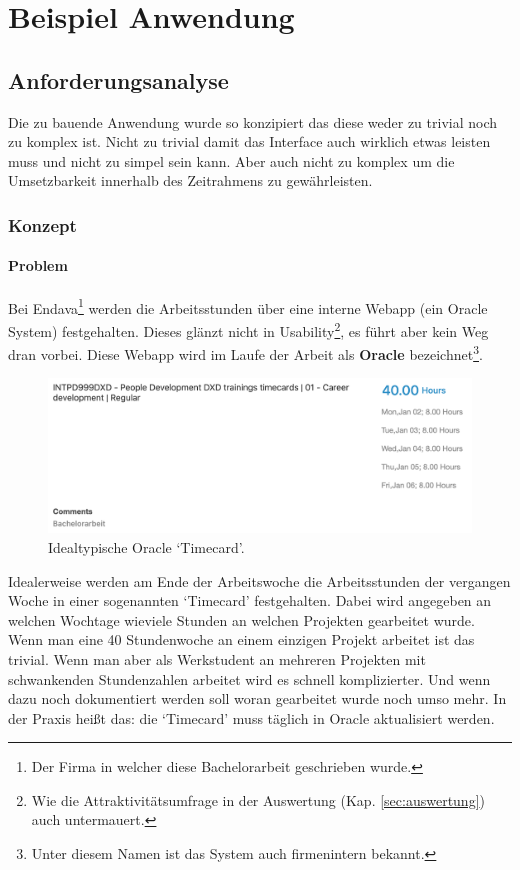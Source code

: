 \documentclass[oneside,bibliography=totocnumbered,BCOR=5mm]{scrbook}
\begin{document}
\chapter{Beispiel Anwendung}
\label{sec:beispiel-anwendung}

\section{Anforderungsanalyse}

Die zu bauende Anwendung wurde so konzipiert das diese weder zu trivial noch
zu komplex ist. Nicht zu trivial damit das Interface auch wirklich etwas
leisten muss und nicht zu simpel sein kann. Aber auch nicht zu komplex um die
Umsetzbarkeit innerhalb des Zeitrahmens zu gewährleisten.

\subsection{Konzept}
\subsubsection{Problem}

Bei Endava\footnote{Der Firma in welcher diese Bachelorarbeit geschrieben
wurde.} werden die Arbeitsstunden über eine interne Webapp (ein Oracle
System) festgehalten. Dieses glänzt nicht in Usability\footnote{Wie die
Attraktivitätsumfrage in der Auswertung (Kap. \ref{sec:auswertung}) auch
untermauert.}, es führt aber kein Weg dran vorbei. Diese Webapp wird im Laufe
der Arbeit als \textbf{Oracle} bezeichnet\footnote{Unter diesem Namen ist das
System auch firmenintern bekannt.}.

\begin{figure}[H]
  \centering
  \includegraphics[scale=0.25]{oracle-ideal.png}
  \caption{Idealtypische Oracle `Timecard'.}
\end{figure}

Idealerweise werden am Ende der Arbeitswoche die Arbeitsstunden der vergangen
Woche in einer sogenannten `Timecard' festgehalten. Dabei wird angegeben an
welchen Wochtage wieviele Stunden an welchen Projekten gearbeitet wurde.
Wenn man eine 40 Stundenwoche an einem einzigen Projekt arbeitet ist das
trivial. Wenn man aber als Werkstudent an mehreren Projekten mit schwankenden
Stundenzahlen arbeitet wird es schnell komplizierter. Und wenn dazu noch
dokumentiert werden soll woran gearbeitet wurde noch umso mehr. In der Praxis
heißt das: die ‘Timecard’ muss täglich in Oracle aktualisiert werden.
\end{document}
